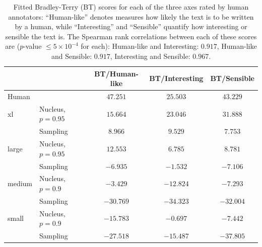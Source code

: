 \documentclass{article}
\theoremstyle{definition}
\newcommand{\tabemph}[1]{\cellcolor{lightmauve!30}\textcolor{black!50!royalazure}{#1}}%
\begin{document}
\begin{table}[t!]
\centering
\begin{adjustbox}{max width=0.99\textwidth}
{\small
\begin{tabular}{llccc}
\toprule
      &          & BT/Human-like & BT/Interesting & BT/Sensible \\
\midrule
Human & {} &      $47.251$ &       $25.503$ &    $43.229$ \\
xl & Nucleus, $p=0.95$ &      \tabemph{$\mathbf{15.664}$} &       \tabemph{$\mathbf{23.046}$} &    \tabemph{$\mathbf{31.888}$} \\
      & Sampling &       $8.966$ &        $9.529$ &     $7.753$ \\
large & Nucleus, $p=0.95$ &      $12.553$ &        $6.785$ &     $8.781$ \\
      & Sampling &      $-6.935$ &       $-1.532$ &    $-7.106$ \\
medium & Nucleus, $p=0.9$ &      $-3.429$ &      $-12.824$ &    $-7.293$ \\
      & Sampling &     $-30.769$ &      $-34.323$ &   $-32.004$ \\
small & Nucleus, $p=0.9$ &     $-15.783$ &       $-0.697$ &    $-7.442$ \\
      & Sampling &     $-27.518$ &      $-15.487$ &   $-37.805$ \\
\bottomrule
\end{tabular}
 }
\end{adjustbox}
\caption{Fitted Bradley-Terry (BT) scores 
for each of the three axes 
rated by human annotators:
``Human-like'' denotes measures how likely 
the text is to be written by a human,
while ``Interesting'' and ``Sensible'' quantify how 
interesting or sensible the text is. 
The Spearman rank correlations between 
each of these scores are
($p$-value $\le 5\times 10^{-4}$ for each):
    Human-like and Interesting: $0.917$,
    Human-like and Sensible: $0.917$,
    Interesting and Sensible: $0.967$.
}
\label{tab:mauve:expt:webtext-human-eval-all}
\end{table}
\end{document}
